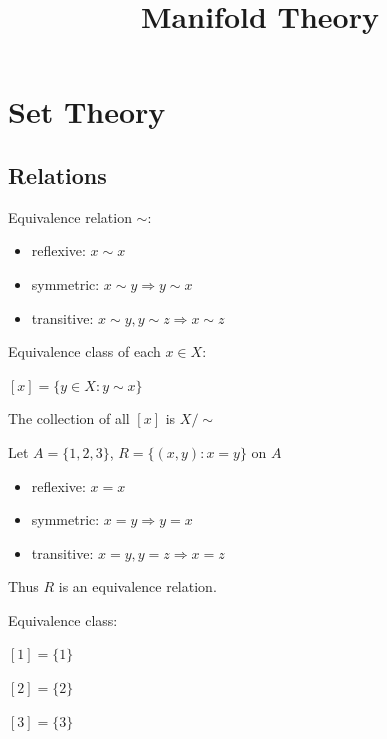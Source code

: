 \documentclass{blog}
\title{Manifold Theory}
\begin{document}
\maketitle
\tableofcontents
\section{Set Theory}
\subsection{Relations}
\begin{definition}
    Equivalence relation $\sim$:

    \begin{itemize}
        \item reflexive: $x \sim x$
        \item symmetric: $x \sim y \Rightarrow y \sim x$
        \item transitive: $x \sim y, y \sim z \Rightarrow x \sim z$
    \end{itemize}
\end{definition}

\begin{definition}
    Equivalence class of each $x \in X$:

    $[x] = \{y \in X : y \sim x\}$
\end{definition}

\begin{definition}
    The collection of all $[x]$ is $X/\sim$
\end{definition}

\begin{example}
    Let $A = \{1,2,3\}$, $R = \{(x,y) : x = y\}$ on $A$

    \begin{itemize}
        \item reflexive: $x=x$
        \item symmetric: $x=y \Rightarrow y=x$
        \item transitive: $x=y,y=z \Rightarrow x=z$
    \end{itemize}

    Thus $R$ is an equivalence relation.

    Equivalence class:

    $[1] = \{1\}$

    $[2] = \{2\}$

    $[3] = \{3\}$
\end{example}
\end{document}
